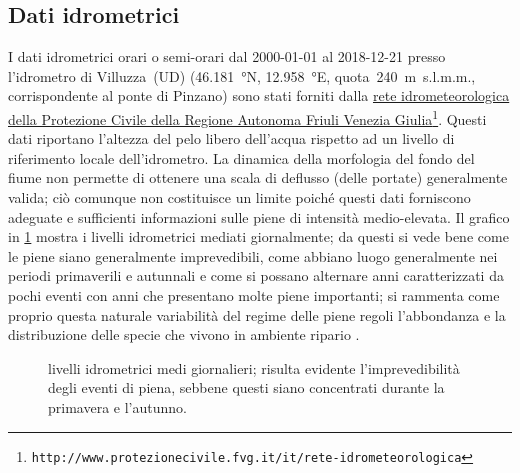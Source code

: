 \subsection{Dati idrometrici}
I dati idrometrici orari o semi-orari dal 2000-01-01 al 2018-12-21 presso l'idrometro di Villuzza~(UD) (\SI{46.181}{\degree}N, \SI{12.958}{\degree}E, quota~\SI{240}{\m}~s.l.m.m., corrispondente al ponte di Pinzano) sono stati forniti dalla \href{http://www.protezionecivile.fvg.it/it/rete-idrometeorologica}{rete idrometeorologica della Protezione Civile della Regione Autonoma Friuli Venezia Giulia}\footnote{\texttt{http://www.protezionecivile.fvg.it/it/rete-idrometeorologica}}.
Questi dati riportano l'altezza del pelo libero dell'acqua rispetto ad un livello di riferimento locale dell'idrometro.
La dinamica della morfologia del fondo del fiume non permette di ottenere una scala di deflusso (delle portate) generalmente valida; ciò comunque non costituisce un limite poiché questi dati forniscono adeguate e sufficienti informazioni sulle piene di intensità medio-elevata.
Il grafico in \cref{graph:livelli-matrix} mostra i livelli idrometrici mediati giornalmente; da questi si vede bene come le piene siano generalmente imprevedibili, come abbiano luogo generalmente nei periodi primaverili e autunnali e come si possano alternare anni caratterizzati da pochi eventi con anni che presentano molte piene importanti; si rammenta come proprio questa naturale variabilità del regime delle piene regoli l'abbondanza e la distribuzione delle specie che vivono in ambiente ripario .
%
\begin{figure}
	\centering
	
	\caption[livelli idrometrici medi giornalieri]{livelli idrometrici medi giornalieri; risulta evidente l'imprevedibilità degli eventi di piena, sebbene questi siano concentrati durante la primavera e l'autunno.}
	\label{graph:livelli-matrix}
\end{figure}

